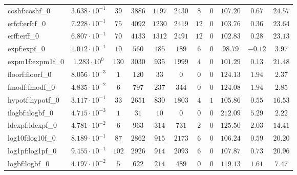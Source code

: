 \begin{tabular}{|l|c|c|c|c|c|c|c|c|c|c|}
coshf:coshf\_0               & $ 3.638 \cdot 10^{-1} $ & $ 39     $ & $ 3886  $ & $ 1197  $ & $ 2430  $ & $ 8   $ & $ 0 $ & $ 107.20      $ & $ 0.67    $ & $ 24.57   $ \\
erfcf:erfcf\_0               & $ 7.228 \cdot 10^{-1} $ & $ 75     $ & $ 4092  $ & $ 1230  $ & $ 2419  $ & $ 12  $ & $ 0 $ & $ 103.76      $ & $ 0.36    $ & $ 23.64   $ \\
erff:erff\_0                 & $ 6.807 \cdot 10^{-1} $ & $ 70     $ & $ 4133  $ & $ 1312  $ & $ 2491  $ & $ 12  $ & $ 0 $ & $ 102.83      $ & $ 0.28    $ & $ 23.13   $ \\
expf:expf\_0                 & $ 1.012 \cdot 10^{-1} $ & $ 10     $ & $ 560   $ & $ 185   $ & $ 189   $ & $ 6   $ & $ 0 $ & $ 98.79       $ & $ -0.12   $ & $ 3.97    $ \\
expm1f:expm1f\_0             & $ 1.283 \cdot 10^{0}  $ & $ 130    $ & $ 3030  $ & $ 935   $ & $ 1999  $ & $ 4   $ & $ 0 $ & $ 101.29      $ & $ 0.13    $ & $ 21.48   $ \\
floorf:floorf\_0             & $ 8.056 \cdot 10^{-3} $ & $ 1      $ & $ 120   $ & $ 33    $ & $ 0     $ & $ 0   $ & $ 0 $ & $ 124.13      $ & $ 1.94    $ & $ 2.37    $ \\
fmodf:fmodf\_0               & $ 4.835 \cdot 10^{-2} $ & $ 6      $ & $ 797   $ & $ 237   $ & $ 344   $ & $ 0   $ & $ 0 $ & $ 124.08      $ & $ 1.94    $ & $ 2.85    $ \\
hypotf:hypotf\_0             & $ 3.117 \cdot 10^{-1} $ & $ 33     $ & $ 2651  $ & $ 830   $ & $ 1803  $ & $ 4   $ & $ 1 $ & $ 105.86      $ & $ 0.55    $ & $ 16.53   $ \\
ilogbf:ilogbf\_0             & $ 4.715 \cdot 10^{-3} $ & $ 1      $ & $ 31    $ & $ 10    $ & $ 0     $ & $ 0   $ & $ 0 $ & $ 212.09      $ & $ 5.29    $ & $ 2.22    $ \\
ldexpf:ldexpf\_0             & $ 4.781 \cdot 10^{-2} $ & $ 6      $ & $ 963   $ & $ 314   $ & $ 731   $ & $ 2   $ & $ 0 $ & $ 125.50      $ & $ 2.03    $ & $ 14.41   $ \\
log10f:log10f\_0             & $ 8.189 \cdot 10^{-1} $ & $ 87     $ & $ 2862  $ & $ 915   $ & $ 2173  $ & $ 6   $ & $ 0 $ & $ 106.24      $ & $ 0.59    $ & $ 20.20   $ \\
log1pf:log1pf\_0             & $ 9.455 \cdot 10^{-1} $ & $ 102    $ & $ 2926  $ & $ 914   $ & $ 2093  $ & $ 6   $ & $ 0 $ & $ 107.87      $ & $ 0.73    $ & $ 20.96   $ \\
logbf:logbf\_0               & $ 4.197 \cdot 10^{-2} $ & $ 5      $ & $ 622   $ & $ 214   $ & $ 489   $ & $ 0   $ & $ 0 $ & $ 119.13      $ & $ 1.61    $ & $ 7.47    $ \\

\end{tabular}
